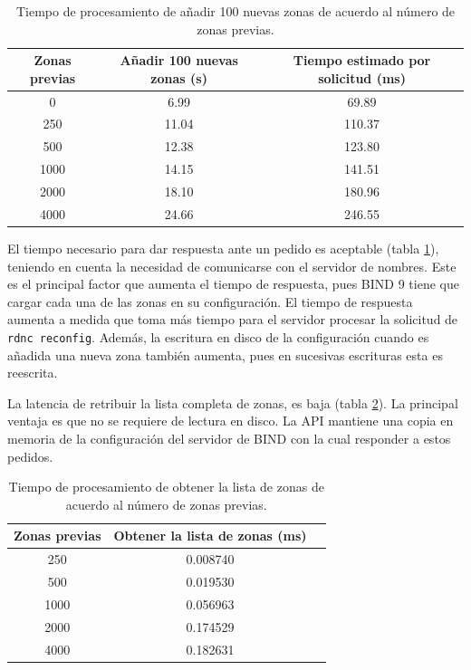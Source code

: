 \begin{table}[!ht]
    \centering
    \begin{tabular}{|c|c|c|}
    \hline
    \multicolumn{1}{|p{4cm}|}{\centering\textbf{Zonas previas}} & \multicolumn{1}{|p{4cm}|}{\centering \textbf{Añadir 100 nuevas zonas (s)}} & \multicolumn{1}{|p{4cm}|}{\centering \textbf{Tiempo estimado por solicitud (ms)}} \\ \hline
        0 & 6.99 & 69.89 \\ \hline
        250 & 11.04 & 110.37 \\ \hline
        500 & 12.38 & 123.80 \\ \hline
        1000 & 14.15 & 141.51 \\ \hline
        2000 & 18.10 & 180.96 \\ \hline
        4000 & 24.66 & 246.55 \\ \hline
    \end{tabular}
    \caption{Tiempo de procesamiento de añadir 100 nuevas zonas de acuerdo al número de zonas previas.}
    \label{table:add-zones}
\end{table}

El tiempo necesario para dar respuesta ante un pedido es aceptable (tabla \ref{table:add-zones}), teniendo en cuenta la necesidad de comunicarse con el servidor de nombres. Este es el principal factor que aumenta el tiempo de respuesta, pues BIND 9 tiene que cargar cada una de las zonas en su configuración. El tiempo de respuesta aumenta a medida que toma más tiempo para el servidor procesar la solicitud de \verb|rdnc reconfig|. Además, la escritura en disco de la configuración cuando es añadida una nueva zona también aumenta, pues en sucesivas escrituras esta es reescrita.

La latencia de retribuir la lista completa de zonas, es baja (tabla \ref{table:get-zones}). La principal ventaja es que no se requiere de lectura en disco. La API mantiene una copia en memoria de la configuración del servidor de BIND con la cual responder a estos pedidos.

\begin{table}[!ht]
    \centering
    \begin{tabular}{|c|c|c|}
    \hline
    \multicolumn{1}{|p{4cm}|}{\centering\textbf{Zonas previas}} & \multicolumn{1}{|p{7cm}|}{\centering \textbf{Obtener la lista de zonas (ms)}} \\ \hline
        250  & 0.008740  \\ \hline
        500  & 0.019530  \\ \hline
        1000 & 0.056963  \\ \hline
        2000 & 0.174529  \\ \hline
        4000 & 0.182631  \\ \hline
    \end{tabular}
    \caption{Tiempo de procesamiento de obtener la lista de zonas de acuerdo al número de zonas previas.}
    \label{table:get-zones}
\end{table}

